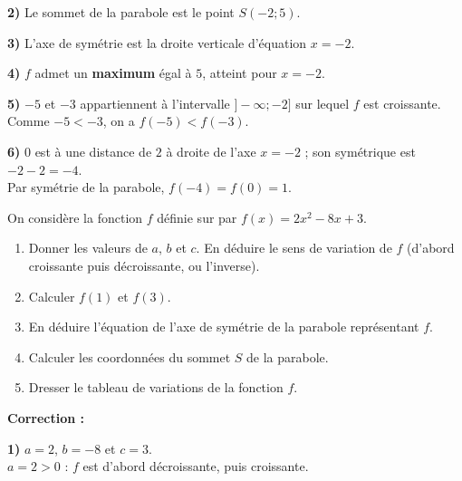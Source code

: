 \documentclass[11pt,a4paper]{book}
\begin{document}
\medskip
\begin{corrBox}
	\textbf{2)} Le sommet de la parabole est le point $S(-2 ; 5)$.
\end{corrBox}

\medskip
\begin{corrBox}
	\textbf{3)} L'axe de symétrie est la droite verticale d'équation $x=-2$.
\end{corrBox}

\medskip
\begin{corrBox}
	\textbf{4)} $f$ admet un \textbf{maximum} égal à $5$, atteint pour $x=-2$.
\end{corrBox}

\medskip
\begin{corrBox}
	\textbf{5)} $-5$ et $-3$ appartiennent à l'intervalle $]-\infty ; -2]$ sur lequel $f$ est croissante.\\
	Comme $-5<-3$, on a $f(-5)<f(-3)$.
\end{corrBox}

\medskip
\begin{corrBox}
	\textbf{6)} $0$ est à une distance de $2$ à droite de l'axe $x=-2$ ; son symétrique est $-2-2=-4$.\\
	Par symétrie de la parabole, $f(-4)=f(0)=1$.
\end{corrBox}

\exerciceDS{}

On considère la fonction $f$ définie sur \R par $f(x)=2x^2-8x+3$.

\begin{enumerate}[label=\textbf{\arabic*)}]
	\item Donner les valeurs de $a$, $b$ et $c$. En déduire le sens de variation de $f$ (d'abord croissante puis décroissante, ou l'inverse).
	\item Calculer $f(1)$ et $f(3)$.
	\item En déduire l'équation de l'axe de symétrie de la parabole représentant $f$.
	\item Calculer les coordonnées du sommet $S$ de la parabole.
	\item Dresser le tableau de variations de la fonction $f$.
\end{enumerate}

\medskip
\noindent\textbf{\color{red!75!black}Correction :}

\smallskip
\begin{corrBox}
	\textbf{1)} $a=2$, $b=-8$ et $c=3$.\\
	$a=2>0$ : $f$ est d'abord décroissante, puis croissante.
\end{corrBox}
\end{document}

